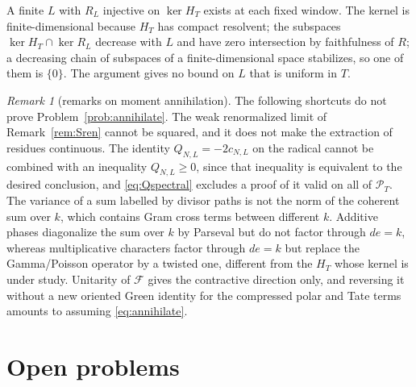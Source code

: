 \documentclass[11pt]{amsart}
\theoremstyle{definition}
\theoremstyle{remark}
\newtheorem{remark}[theorem]{Remark}
\newcommand{\PT}{\mathcal P_T}
\begin{document}
A finite $L$ with $R_L$ injective on $\ker H_T$ exists at each fixed window. The kernel is
finite-dimensional because $H_T$ has compact resolvent; the subspaces $\ker H_T\cap\ker R_L$ decrease
with $L$ and have zero intersection by faithfulness of $R$; a decreasing chain of subspaces of a
finite-dimensional space stabilizes, so one of them is $\{0\}$. The argument gives no bound on $L$
that is uniform in $T$.

\begin{remark}[remarks on moment annihilation]\label{rem:returnremarks}
The following shortcuts do not prove Problem~\ref{prob:annihilate}. The weak renormalized limit of
Remark~\ref{rem:Sren} cannot be squared, and it does not make the extraction of residues continuous.
The identity $Q_{N,L}=-2c_{N,L}$ on the radical cannot be combined with an inequality $Q_{N,L}\ge0$,
since that inequality is equivalent to the desired conclusion, and \eqref{eq:Qspectral} excludes a
proof of it valid on all of $\PT$. The variance of a sum labelled by divisor paths is not the norm of
the coherent sum over $k$, which contains Gram cross terms between different $k$. Additive phases
diagonalize the sum over $k$ by Parseval but do not factor through $de=k$, whereas multiplicative
characters factor through $de=k$ but replace the Gamma/Poisson operator by a twisted one, different
from the $H_T$ whose kernel is under study. Unitarity of $\mathscr F$ gives the contractive direction
only, and reversing it without a new oriented Green identity for the compressed polar and Tate terms
amounts to assuming \eqref{eq:annihilate}.
\end{remark}


\section{Open problems}\label{sec:repro}
\end{document}
